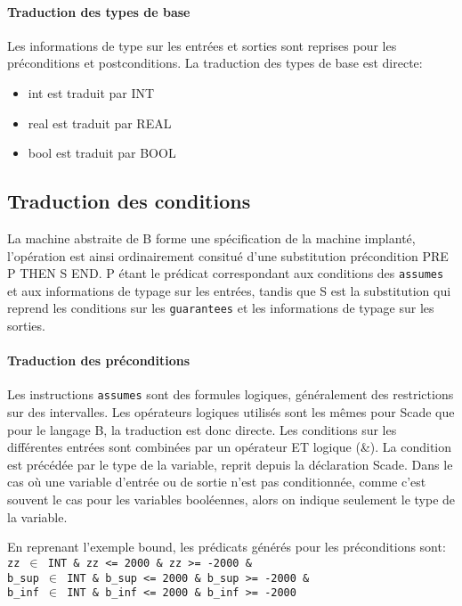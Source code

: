 \paragraph{Traduction des types de base}
Les informations de type sur les entrées et sorties sont reprises pour les
préconditions et postconditions.
La traduction des types de base est directe:
\begin{itemize}
\item int est traduit par INT
\item real est traduit par REAL
\item bool est traduit par BOOL
\end{itemize}


\subsection{Traduction des conditions}

La machine abstraite de B forme une spécification de la machine implanté,
l'opération est ainsi ordinairement consitué d'une substitution précondition
PRE P THEN S END. P étant le prédicat correspondant aux conditions des
\texttt{assumes} et aux informations de typage sur les entrées, tandis que S est
la substitution qui reprend les conditions sur les \texttt{guarantees} et les informations de typage
sur les sorties. 

\paragraph{Traduction des préconditions}
Les instructions \texttt{assumes} sont des formules logiques, généralement des
restrictions sur des intervalles. Les opérateurs logiques utilisés sont les
mêmes pour Scade que pour le langage B, la traduction est donc directe. Les
conditions sur les différentes entrées sont combinées par un opérateur ET
logique (\&). La condition est précédée par le type de la variable, reprit
depuis la déclaration Scade. 
Dans le cas où une variable d'entrée ou de sortie n'est pas conditionnée, comme
c'est souvent le cas pour les variables booléennes, alors on indique seulement
le type de la variable.

\noindent
En reprenant l'exemple bound, les prédicats générés pour les
préconditions sont:\\

\noindent
\texttt{zz $\in$ INT \& zz <= 2000 \& zz >= -2000 \& \\
b\_sup $\in$ INT \& b\_sup <= 2000 \& b\_sup >= -2000 \& \\
b\_inf $\in$ INT \& b\_inf <= 2000 \& b\_inf >= -2000 \\
}


